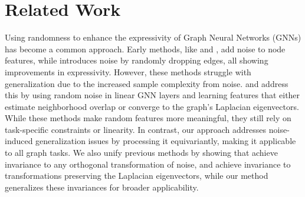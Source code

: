 \section{Related Work}
Using randomness to enhance the expressivity of Graph Neural Networks (GNNs) has become a common approach. Early methods, like \citet{GNN-RNI} and \citet{rGIN}, add noise to node features, while \citet{DropGNN} introduces noise by randomly dropping edges, all showing improvements in expressivity. However, these methods struggle with generalization due to the increased sample complexity from noise. \citet{mplp} and \citet{randomeigen} address this by using random noise in linear GNN layers and learning features that either estimate neighborhood overlap or converge to the graph’s Laplacian eigenvectors. While these methods make random features more meaningful, they still rely on task-specific constraints or linearity. In contrast, our approach addresses noise-induced generalization issues by processing it equivariantly, making it applicable to all graph tasks. We also unify previous methods by showing that \citet{mplp} achieve invariance to any orthogonal transformation of noise, and \citet{randomeigen} achieve invariance to transformations preserving the Laplacian eigenvectors, while our method generalizes these invariances for broader applicability.


